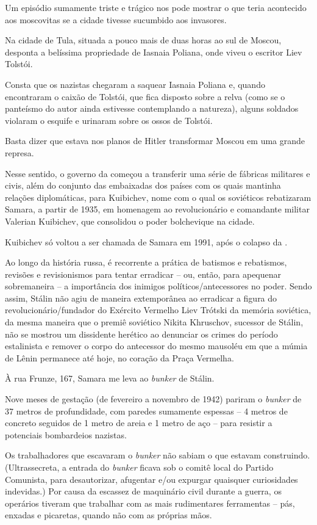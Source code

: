 Um episódio sumamente triste e trágico nos pode mostrar o que teria
acontecido aos moscovitas se a cidade tivesse sucumbido aos invasores.

Na cidade de Tula, situada a pouco mais de duas horas ao sul de Moscou,
desponta a belíssima propriedade de Iasnaia Poliana, onde viveu o
escritor Liev Tolstói.

Consta que os nazistas chegaram a saquear Iasnaia Poliana e, quando
encontraram o caixão de Tolstói, que fica disposto sobre a relva (como
se o panteísmo do autor ainda estivesse contemplando a natureza), alguns
soldados violaram o esquife e urinaram sobre os ossos de Tolstói.

Basta dizer que estava nos planos de Hitler transformar Moscou em uma
grande represa.

Nesse sentido, o governo da  começou a transferir uma série de
fábricas militares e civis, além do conjunto das embaixadas dos países
com os quais mantinha relações diplomáticas, para Kuibichev, nome com o
qual os soviéticos rebatizaram Samara, a partir de 1935, em homenagem ao
revolucionário e comandante militar Valerian Kuibichev, que consolidou o
poder bolchevique na cidade.

Kuibichev só voltou a ser chamada de Samara em 1991, após o colapso da
.

Ao longo da história russa, é recorrente a prática de batismos e
rebatismos, revisões e revisionismos para tentar erradicar -- ou, então,
para apequenar sobremaneira -- a importância dos inimigos
políticos/antecessores no poder. Sendo assim, Stálin não agiu de maneira
extemporânea ao erradicar a figura do revolucionário/fundador do
Exército Vermelho Liev Trótski da memória soviética, da mesma maneira
que o premiê soviético Nikita Khruschov, sucessor de Stálin, não se
mostrou um dissidente herético ao denunciar os crimes do período
estalinista e remover o corpo do antecessor do mesmo mausoléu em que a
múmia de Lênin permanece até hoje, no coração da Praça Vermelha.

À rua Frunze, 167, Samara me leva ao \emph{bunker} de Stálin.

Nove meses de gestação (de fevereiro a novembro de 1942) pariram o
\emph{bunker} de 37 metros de profundidade, com paredes sumamente
espessas -- 4 metros de concreto seguidos de 1 metro de areia e 1 metro
de aço -- para resistir a potenciais bombardeios nazistas.

Os trabalhadores que escavaram o \emph{bunker} não sabiam o que estavam
construindo. (Ultrassecreta, a entrada do \emph{bunker} ficava sob o
comitê local do Partido Comunista, para desautorizar, afugentar e/ou
expurgar quaisquer curiosidades indevidas.) Por causa da escassez de
maquinário civil durante a guerra, os operários tiveram que trabalhar
com as mais rudimentares ferramentas -- pás, enxadas e picaretas, quando
não com as próprias mãos.

